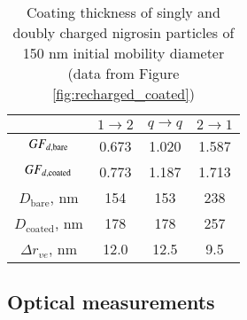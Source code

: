 \begin{table}[htp]
    \centering
    \caption{Coating thickness of singly and doubly charged nigrosin particles of 150 nm initial mobility diameter (data from Figure \ref{fig:recharged_coated})}
    \begin{tabular}{c c c c}
        \hline
        & $1\rightarrow 2$ & $q\rightarrow q$ & $2\rightarrow 1$ \\
        \hline
        $GF_{d,\rm bare}$ & 0.673 & 1.020 & 1.587\\
        $GF_{d,\rm coated}$ & 0.773 & 1.187 & 1.713\\
        $D_{\mathrm{bare}}$, nm & 154 & 153 & 238 \\
        $D_{\mathrm{coated}}$, nm & 178 & 178 & 257 \\
        $\Delta r_{ve}$, nm & 12.0 & 12.5 & 9.5 \\
        \hline
    \end{tabular}
    \label{tab:recharged_coated}
\end{table}

\subsection{Optical measurements}


